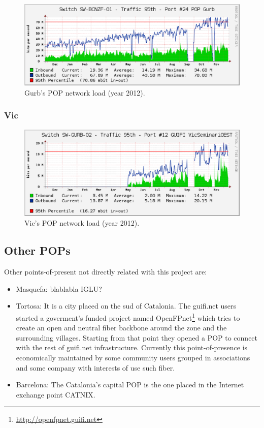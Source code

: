 \begin{figure}[htbp]
  \centering
  \includegraphics[scale=.65]{sect3/figures/gurb_network_load_year.eps} 
  \caption{Gurb's POP network load (year 2012).}
  \label{fig:gurb_net_load}
\end{figure}


\subsubsection{Vic}



\begin{figure}[htbp]
  \centering
  \includegraphics[scale=.65]{sect3/figures/vic_network_load_year.eps} 
  \caption{Vic's POP network load (year 2012).}
  \label{fig:vic_net_load}
\end{figure}



\subsection{Other POPs}

Other points-of-present not directly related with this project are:

\begin{itemize}
	\item Masquefa: blablabla IGLU?

	\item Tortosa: It is a city placed on the sud of Catalonia. The guifi.net users started a goverment's funded project named 
		OpenFPnet\footnote{\url{http://openfpnet.guifi.net}} which tries to create an open and neutral fiber backbone 
		around the zone and the surrounding villages. Starting from that point they opened a POP to connect with the 
		rest of guifi.net infrastructure. Currently this point-of-presence is economically maintained by some community 
		users grouped in associations and some company with interests of use such fiber.

	\item Barcelona: The Catalonia's capital POP is the one placed in the Internet exchange point CATNIX.
\end{itemize}

